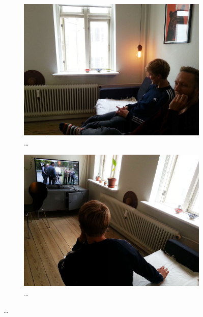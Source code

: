 \begin{figure}
        \centering
        \begin{subfigure}[b]{0.45\textwidth}
                \centering
                \includegraphics[width=\textwidth]{figures/touch/evaluation/sebastian/in_sofa}
                \caption{\dots}
                \label{fig:textiletouch:eval:sebastian:sofa}
        \end{subfigure}
        \begin{subfigure}[b]{0.45\textwidth}
                \centering
                \includegraphics[width=\textwidth]{figures/touch/evaluation/sebastian/sofa_behind_seb}
                \caption{\dots}
                \label{fig:textiletouch:eval:sebastian:sofa_behind}
        \end{subfigure}


\end{figure}
